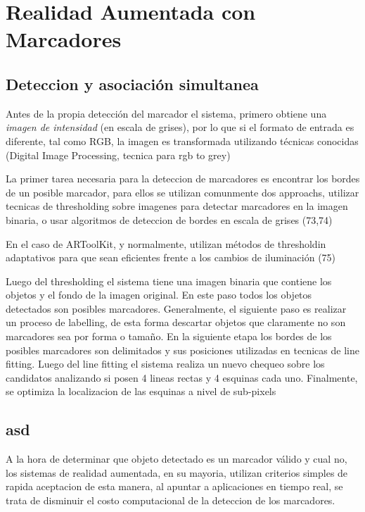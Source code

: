 \documentclass[runningheads]{llncs}
\begin{document}
	\section{Realidad Aumentada con Marcadores}
	\subsection{Deteccion y asociación simultanea}
	
	Antes de la propia detección del marcador el sistema, primero obtiene una \textit{imagen de intensidad} (en escala de grises), por lo que si el formato de entrada es diferente, tal como RGB, la imagen es transformada utilizando técnicas conocidas
	(Digital Image Processing, tecnica para rgb to grey)
	
	La primer tarea necesaria para la deteccion de marcadores es encontrar los bordes de un posible marcador, para ellos se utilizan comunmente dos approachs, utilizar tecnicas de thresholding sobre imagenes para detectar marcadores en la imagen binaria, o usar algoritmos de deteccion de bordes en escala de grises (73,74)
	
	En el caso de ARToolKit, y normalmente, utilizan métodos de thresholdin adaptativos para que sean eficientes frente a los cambios de iluminación (75)
	
	Luego del thresholding el sistema tiene una imagen binaria que contiene los objetos y el fondo de la imagen original. En este paso todos los objetos detectados son posibles marcadores. Generalmente, el siguiente paso es realizar un proceso de labelling, de esta forma descartar objetos que claramente no son marcadores sea por forma o tamaño.
	En la siguiente etapa los bordes de los posibles marcadores son delimitados y sus posiciones utilizadas en tecnicas de line fitting. Luego del line fitting el sistema realiza un nuevo chequeo sobre los candidatos analizando si posen 4 lineas rectas y 4 esquinas cada uno. Finalmente, se optimiza la localizacion de las esquinas a nivel de sub-pixels
	
	\subsection{asd}
	A la hora de determinar que objeto detectado es un marcador válido y cual no, los sistemas de realidad aumentada, en su mayoria, utilizan criterios simples de rapida aceptacion de esta manera, al apuntar a aplicaciones en tiempo real, se trata de disminuir el costo computacional de la deteccion de los marcadores.
	
\end{document}
